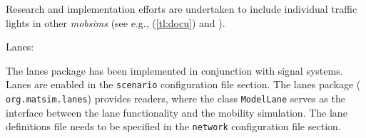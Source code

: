 Research and implementation efforts are undertaken to include individual traffic lights in other \emph{mobsims} (see e.g., (\ref{tl:docu}) and \citet[][]{Neumann_MastersThesis_2008}).


Lanes:

The lanes package has been implemented in conjunction with signal systems. Lanes are enabled in the \lstinline|scenario| configuration file section. The lanes package (\lstinline| org.matsim.lanes|) provides readers, where the class \lstinline|ModelLane| serves as the interface between the lane functionality and the mobility simulation. The lane definitions file needs to be specified in the \lstinline|network| configuration file section.

